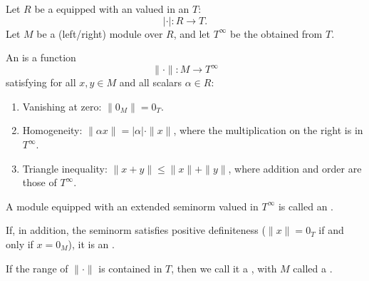 \begin{definition} \label{definition:extended_seminorm_on_a_module_over_a_commutative_ring_with_absolute_value}
    Let $R$ be a  equipped with an  valued in an  $T$:
    $$|\cdot| : R \to T.$$
    Let $M$ be a (left/right) module over $R$, and let $T^\infty$ be the  obtained from $T$.

    An  is a function
    $$\|\cdot\| : M \to T^\infty$$
    satisfying for all $x, y \in M$ and all scalars $\alpha \in R$:
    \begin{enumerate}
        \item Vanishing at zero: $\|0_M\| = 0_T$.
        \item Homogeneity: $\|\alpha x\| = |\alpha| \cdot \|x\|$, where the multiplication on the right is in $T^\infty$.
        \item Triangle inequality: $\|x + y\| \leq \|x\| + \|y\|$, where addition and order are those of $T^\infty$.
    \end{enumerate}
    A module equipped with an extended seminorm valued in $T^\infty$ is called an .

    If, in addition, the seminorm satisfies positive definiteness ($\|x\| = 0_T$ if and only if $x = 0_M$), it is an .

    If the range of $\|\cdot\|$ is contained in $T$, then we call it a , with $M$ called a .
\end{definition}
